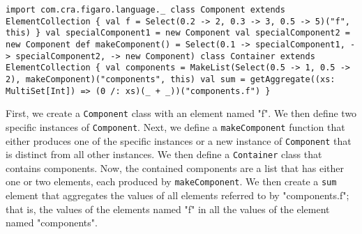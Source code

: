 \begin{flushleft}
\texttt{import com.cra.figaro.language.\_
\newline 
\newline class Component extends ElementCollection \{
\newline \tab val f = Select(0.2 -> 2, 0.3 -> 3, 0.5 -> 5)("f", this)
\newline \}
\newline 
\newline val specialComponent1 = new Component 
\newline val specialComponent2 = new Component
\newline 
\newline def makeComponent() =
\newline \tab Select(0.1 -> specialComponent1,
\newline {} -> specialComponent2,
\newline {} -> new Component)
\newline 
\newline class Container extends ElementCollection \{
\newline \tab  val components = MakeList(Select(0.5 -> 1, 0.5 -> 2), makeComponent)("components", this)
\newline 
{}
\newline val sum = getAggregate((xs: MultiSet[Int]) => (0 /: xs)(\_ + \_))("components.f") 
\newline \}
}
\end{flushleft}

First, we create a \texttt{Component} class with an element named "f". We then define two specific instances of \texttt{Component}. Next, we define a \texttt{makeComponent} function that either produces one of the specific instances or a new instance of \texttt{Component} that is distinct from all other instances. We then define a \texttt{Container} class that contains components. Now, the contained components are a list that has either one or two elements, each produced by \texttt{makeComponent}. We then create a \texttt{sum} element that aggregates the values of all elements referred to by "components.f"; that is, the values of the elements named "f" in all the values of the element named "components".

